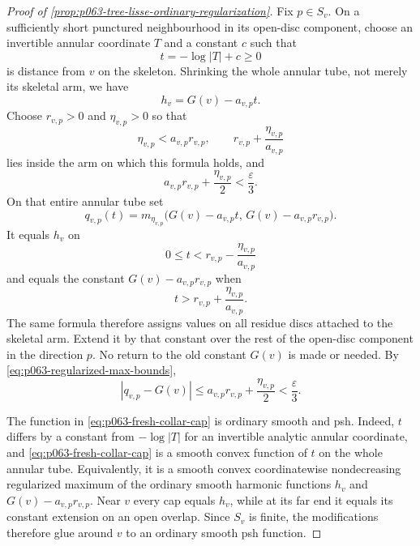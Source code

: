 \begin{proof}[Proof of
\cref{prop:p063-tree-lisse-ordinary-regularization}]
Fix \(p\in S_v\).  On a sufficiently short punctured neighbourhood in its
open-disc component, choose an invertible annular coordinate \(T\) and a
constant \(c\) such that
\[
                         t=-\log|T|+c\geq0
\]
is distance from \(v\) on the skeleton.  Shrinking the whole annular tube,
not merely its skeletal arm, we have
\[
                         h_v=G(v)-a_{v,p}t.
\]
Choose \(r_{v,p}>0\) and \(\eta_{v,p}>0\) so that
\[
 \eta_{v,p}<a_{v,p}r_{v,p},
 \qquad
 r_{v,p}+\frac{\eta_{v,p}}{a_{v,p}}
\]
lies inside the arm on which this formula holds, and
\begin{equation}
\label{eq:p063-fresh-collar-error-choice}
 a_{v,p}r_{v,p}+\frac{\eta_{v,p}}2
 <\frac{\varepsilon}{3}.
\end{equation}
On that entire annular tube set
\begin{equation}
\label{eq:p063-fresh-collar-cap}
 q_{v,p}(t)
  =
 m_{\eta_{v,p}}\bigl(
     G(v)-a_{v,p}t,\,
     G(v)-a_{v,p}r_{v,p}
   \bigr).
\end{equation}
It equals \(h_v\) on
\[
               0\leq t<
               r_{v,p}-\frac{\eta_{v,p}}{a_{v,p}}
\]
and equals the constant \(G(v)-a_{v,p}r_{v,p}\) when
\[
               t>
               r_{v,p}+\frac{\eta_{v,p}}{a_{v,p}}.
\]
The same formula therefore assigns values on all residue discs attached to
the skeletal arm.  Extend it by that constant over the rest of the
open-disc component in the direction \(p\).  No return to the old constant
\(G(v)\) is made or needed.  By
\eqref{eq:p063-regularized-max-bounds},
\begin{equation}
\label{eq:p063-fresh-collar-error}
 \left|q_{v,p}-G(v)\right|
 \leq a_{v,p}r_{v,p}+\frac{\eta_{v,p}}2
 <\frac{\varepsilon}{3}.
\end{equation}

The function in \eqref{eq:p063-fresh-collar-cap} is ordinary smooth and
psh.  Indeed, \(t\) differs by a constant from \(-\log|T|\) for an
invertible analytic annular coordinate, and
\eqref{eq:p063-fresh-collar-cap} is a smooth convex function of \(t\) on
the whole annular tube.
Equivalently, it is a smooth convex coordinatewise nondecreasing
regularized maximum of the ordinary smooth harmonic functions \(h_v\)
and \(G(v)-a_{v,p}r_{v,p}\).  Near \(v\) every cap equals \(h_v\), while
at its far end it equals its constant extension on an open overlap.
Since \(S_v\) is finite, the modifications therefore glue around \(v\)
to an ordinary smooth psh function.


\end{proof}
